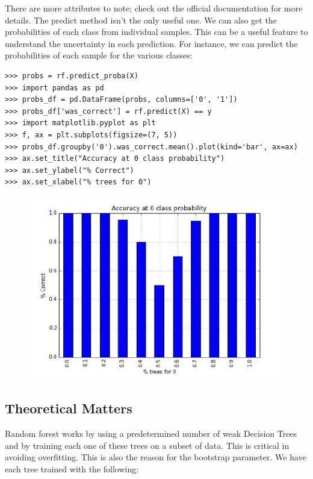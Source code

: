 \documentclass[SKL-MASTER.tex]{subfiles}
\begin{document}
There are more attributes to note; check out the official documentation for more details.
The predict method isn't the only useful one. We can also get the probabilities of each
class from individual samples. This can be a useful feature to understand the uncertainty
in each prediction. For instance, we can predict the probabilities of each sample for the
various classes:
\begin{framed}
	\begin{verbatim}
>>> probs = rf.predict_proba(X)
>>> import pandas as pd
>>> probs_df = pd.DataFrame(probs, columns=['0', '1'])
>>> probs_df['was_correct'] = rf.predict(X) == y
>>> import matplotlib.pyplot as plt
>>> f, ax = plt.subplots(figsize=(7, 5))
>>> probs_df.groupby('0').was_correct.mean().plot(kind='bar', ax=ax)
>>> ax.set_title("Accuracy at 0 class probability")
>>> ax.set_ylabel("% Correct")
>>> ax.set_xlabel("% trees for 0")
\end{verbatim}
\end{framed}
\begin{figure}
\centering
\includegraphics[width=0.7\linewidth]{images/SKL42-RF1}
\caption{}
\label{fig:SKL42-RF1}
\end{figure}

\subsection*{Theoretical Matters}
Random forest works by using a predetermined number of weak Decision Trees and by training
each one of these trees on a subset of data. This is critical in avoiding overfitting. This is also the
reason for the bootstrap parameter. We have each tree trained with the following:
\end{document}
